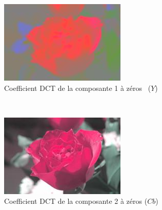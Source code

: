 \begin{figure}[H]
    \centering
    \begin{subfigure}[b]{0.3\textwidth}
        \includegraphics[width=\textwidth]{../SRC/test_b0.jpg}
        \caption{Coefficient DCT de la composante 1 à zéros ~($Y$)}
        \label{img:2}
    \end{subfigure}
    ~ %
    \begin{subfigure}[b]{0.3\textwidth}
        \includegraphics[width=\textwidth]{../SRC/test_b1.jpg}
        \caption{Coefficient DCT de la composante 2 à zéros ($Cb$)}
        \label{img:3}
    \end{subfigure}
    ~ %
    \begin{subfigure}[b]{0.3\textwidth}

\end{subfigure}
\end{figure}
